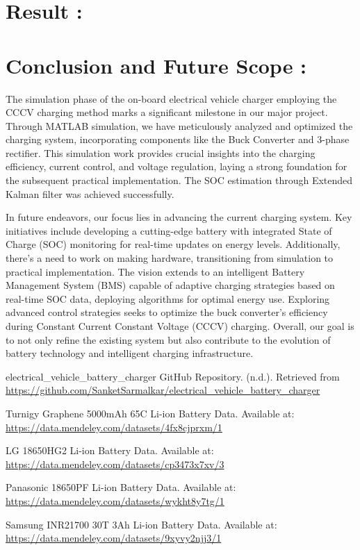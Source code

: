 \documentclass[conference]{IEEEtran}
\begin{document}
\section{Result :}
\section{Conclusion and Future Scope :}
The simulation phase of the on-board electrical vehicle charger employing the CCCV charging method marks a significant milestone in our major project. Through MATLAB simulation, we have meticulously analyzed and optimized the charging system, incorporating components like the Buck Converter and 3-phase rectifier. This simulation work provides crucial insights into the charging efficiency, current control, and voltage regulation, laying a strong foundation for the subsequent practical implementation. The SOC estimation through Extended Kalman filter was achieved successfully.

In future endeavors, our focus lies in advancing the current charging system. Key initiatives include developing a cutting-edge battery with integrated State of Charge (SOC) monitoring for real-time updates on energy levels. Additionally, there's a need to work on making hardware, transitioning from simulation to practical implementation. The vision extends to an intelligent Battery Management System (BMS) capable of adaptive charging strategies based on real-time SOC data, deploying algorithms for optimal energy use. Exploring advanced control strategies seeks to optimize the buck converter’s efficiency during Constant Current Constant Voltage (CCCV) charging. Overall, our goal is to not only refine the existing system but also contribute to the evolution of battery technology and intelligent charging infrastructure.

\begin{thebibliography}{00}
 electrical\_vehicle\_battery\_charger GitHub Repository. (n.d.). Retrieved from \url{https://github.com/SanketSarmalkar/electrical_vehicle_battery_charger}

 Turnigy Graphene 5000mAh 65C Li-ion Battery Data. Available at: \url{https://data.mendeley.com/datasets/4fx8cjprxm/1}

 LG 18650HG2 Li-ion Battery Data. Available at: \url{https://data.mendeley.com/datasets/cp3473x7xv/3}

 Panasonic 18650PF Li-ion Battery Data. Available at: \url{https://data.mendeley.com/datasets/wykht8y7tg/1}

 Samsung INR21700 30T 3Ah Li-ion Battery Data. Available at: \url{https://data.mendeley.com/datasets/9xyvy2njj3/1}

\end{thebibliography}
\vspace{12pt}
\end{document}
